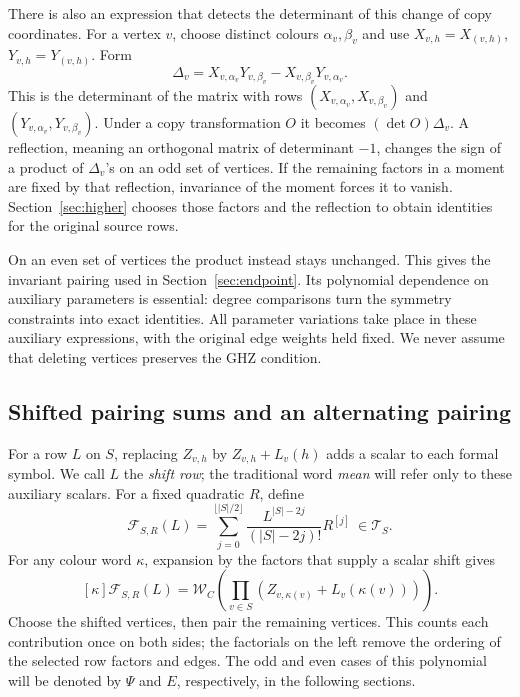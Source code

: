 \documentclass[11pt]{article}
\theoremstyle{definition}
\theoremstyle{plain}
\numberwithin{equation}{section}
\begin{document}
There is also an expression that detects the determinant of this change of
copy coordinates. For a vertex \(v\), choose distinct colours
\(\alpha_v,\beta_v\) and use \(X_{v,h}=X_{(v,h)}\),
\(Y_{v,h}=Y_{(v,h)}\). Form
\[
 \Delta_v=X_{v,\alpha_v}Y_{v,\beta_v}
             -X_{v,\beta_v}Y_{v,\alpha_v}.
\]
This is the determinant of the matrix with rows
\((X_{v,\alpha_v},X_{v,\beta_v})\) and
\((Y_{v,\alpha_v},Y_{v,\beta_v})\). Under a copy transformation \(O\)
it becomes \((\det O)\Delta_v\). A reflection, meaning an orthogonal
matrix of determinant \(-1\), changes the sign of a product of
\(\Delta_v\)'s on an odd set of vertices. If the remaining factors in
a moment are fixed by that reflection, invariance of the moment forces it
to vanish. Section~\ref{sec:higher} chooses those factors and the reflection
to obtain identities for the original source rows.

On an even set of vertices the product instead stays unchanged. This gives
the invariant pairing used in Section~\ref{sec:endpoint}. Its polynomial
dependence on auxiliary parameters is essential: degree comparisons turn
the symmetry constraints into exact identities. All parameter variations
take place in these auxiliary expressions, with the original edge weights
held fixed. We never assume that deleting vertices preserves the GHZ
condition.

\subsection{Shifted pairing sums and an alternating pairing}\label{sec:shifts}

For a row \(L\) on \(S\), replacing \(Z_{v,h}\) by
\(Z_{v,h}+L_v(h)\) adds a scalar to each formal symbol. We call \(L\)
the \emph{shift row}; the traditional word \emph{mean} will refer only to
these auxiliary scalars. For a fixed quadratic \(R\), define
\[
 \mathcal F_{S,R}(L)=
 \sum_{j=0}^{\lfloor |S|/2\rfloor}
       \frac{L^{|S|-2j}}{(|S|-2j)!}R^{[j]}\ \in\mathcal T_S.
\]
For any colour word \(\kappa\), expansion by the factors that supply a
scalar shift gives
\[
 [\kappa]\mathcal F_{S,R}(L)
 =\mathcal W_C\!\left(\prod_{v\in S}
       (Z_{v,\kappa(v)}+L_v(\kappa(v)))\right).
\]
Choose the shifted vertices, then pair the remaining vertices. This counts
each contribution once on both sides; the factorials on the left remove
the ordering of the selected row factors and edges. The odd and even cases
of this polynomial will be denoted by \(\Psi\) and \(E\), respectively,
in the following sections.
\end{document}
